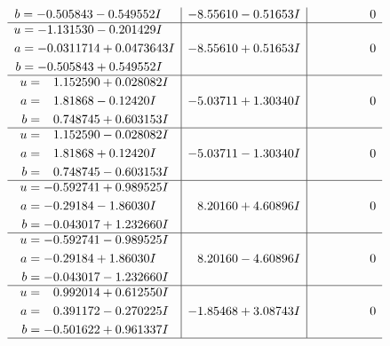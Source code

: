 \documentclass[1p]{elsarticle_modified}
\theoremstyle{definition}
\begin{document}
$$\begin{array}{c|c|c}
\begin{aligned}
b &= -0.505843 - 0.549552 I\end{aligned}
 & -8.55610 - 0.51653 I & \phantom{-0.000000 } 0 \\ \hline\begin{aligned}
u &= -1.131530 - 0.201429 I \\
a &= -0.0311714 + 0.0473643 I \\
b &= -0.505843 + 0.549552 I\end{aligned}
 & -8.55610 + 0.51653 I & \phantom{-0.000000 } 0 \\ \hline\begin{aligned}
u &= \phantom{-}1.152590 + 0.028082 I \\
a &= \phantom{-}1.81868 - 0.12420 I \\
b &= \phantom{-}0.748745 + 0.603153 I\end{aligned}
 & -5.03711 + 1.30340 I & \phantom{-0.000000 } 0 \\ \hline\begin{aligned}
u &= \phantom{-}1.152590 - 0.028082 I \\
a &= \phantom{-}1.81868 + 0.12420 I \\
b &= \phantom{-}0.748745 - 0.603153 I\end{aligned}
 & -5.03711 - 1.30340 I & \phantom{-0.000000 } 0 \\ \hline\begin{aligned}
u &= -0.592741 + 0.989525 I \\
a &= -0.29184 - 1.86030 I \\
b &= -0.043017 + 1.232660 I\end{aligned}
 & \phantom{-}8.20160 + 4.60896 I & \phantom{-0.000000 } 0 \\ \hline\begin{aligned}
u &= -0.592741 - 0.989525 I \\
a &= -0.29184 + 1.86030 I \\
b &= -0.043017 - 1.232660 I\end{aligned}
 & \phantom{-}8.20160 - 4.60896 I & \phantom{-0.000000 } 0 \\ \hline\begin{aligned}
u &= \phantom{-}0.992014 + 0.612550 I \\
a &= \phantom{-}0.391172 - 0.270225 I \\
b &= -0.501622 + 0.961337 I\end{aligned}
 & -1.85468 + 3.08743 I & \phantom{-0.000000 } 0\\
 \hline 
 \end{array}$$\newpage$$\begin{array}{c|c|c}  

\end{array}$$
\end{document}
